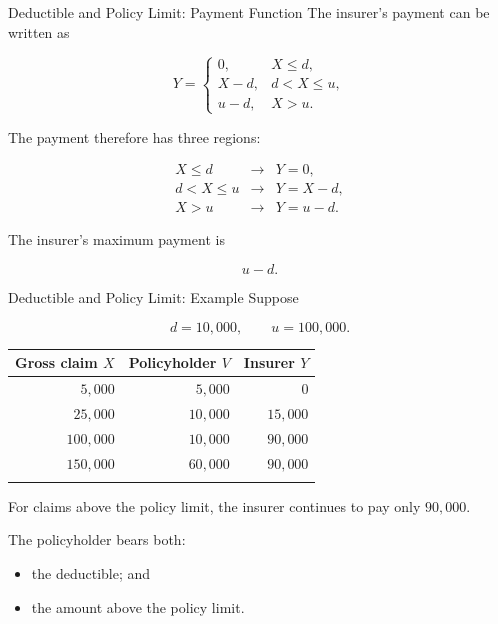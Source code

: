 \documentclass[
  ignorenonframetext,
  aspectratio=169,
]{beamer}
\newcounter{none} %
\providecommand{\tightlist}{%
  \setlength{\itemsep}{0pt}\setlength{\parskip}{0pt}}
\begin{document}
\begin{frame}{Deductible and Policy Limit: Payment Function}
\protect{}\label{deductible-and-policy-limit-payment-function}
The insurer's payment can be written as

\[
Y=
\begin{cases}
0, & X\leq d,\\
X-d, & d<X\leq u,\\
u-d, & X>u.
\end{cases}
\]

The payment therefore has three regions:

\[
\begin{array}{ccl}
X\leq d
&\longrightarrow&
Y=0,\\[4pt]
d<X\leq u
&\longrightarrow&
Y=X-d,\\[4pt]
X>u
&\longrightarrow&
Y=u-d.
\end{array}
\]

The insurer's maximum payment is

\[
\boxed{u-d}.
\]
\end{frame}

\begin{frame}{Deductible and Policy Limit: Example}
\protect{}\label{deductible-and-policy-limit-example-1}
Suppose

\[
d=10{,}000,
\qquad
u=100{,}000.
\]

{\def\LTcaptype{none} %
\begin{longtable}[]{@{}rrr@{}}
\toprule\noalign{}
Gross claim \(X\) & Policyholder \(V\) & Insurer \(Y\) \\
\midrule\noalign{}
\endhead
\(5{,}000\) & \(5{,}000\) & \(0\) \\
\(25{,}000\) & \(10{,}000\) & \(15{,}000\) \\
\(100{,}000\) & \(10{,}000\) & \(90{,}000\) \\
\(150{,}000\) & \(60{,}000\) & \(90{,}000\) \\
\bottomrule\noalign{}
\end{longtable}
}

For claims above the policy limit, the insurer continues to pay only
\(90{,}000\).

The policyholder bears both:

\begin{itemize}
\tightlist
\item
  the deductible; and
\item
  the amount above the policy limit.
\end{itemize}
\end{frame}
\end{document}
